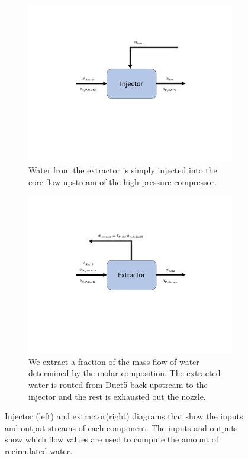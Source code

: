 \documentclass[conf]{new-aiaa}
\begin{document}
\begin{figure}[hbt!]
  \centering
  \begin{subfigure}[t]{0.49\textwidth}
    \includegraphics[width=\textwidth]{injector.pdf}
    \caption{
      Water from the extractor is simply injected into the core flow upstream of the high-pressure compressor.
    }
    \label{fig:injector}
  \end{subfigure}
  \hspace{2pt}
  \begin{subfigure}[t]{0.49\textwidth}
    \includegraphics[width=\textwidth]{extractor.pdf}
    \caption{
      We extract a fraction of the mass flow of water determined by the molar composition.
      The extracted water is routed from Duct5 back upstream to the injector and the rest is exhausted out the nozzle.
    }
    \label{fig:extractor}
  \end{subfigure}
  \caption{Injector (left) and extractor(right) diagrams that show the inputs and output streams of each component.
    The inputs and outputs show which flow values are used to compute the amount of recirculated water.}
  \label{fig:extract_inject}
\end{figure}
\end{document}

